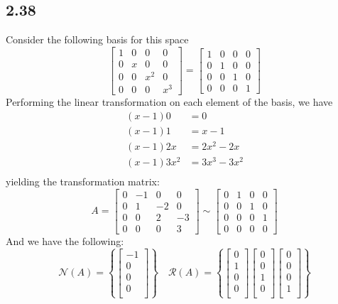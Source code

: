 \documentclass[letterpaper,12pt]{article}
\theoremstyle{definition}
\begin{document}
\subsection*{2.38}
Consider the following basis for this space
\[
\begin{bmatrix}
    1 & 0 & 0 & 0 \\
    0 & x & 0 & 0 \\
    0 & 0 & x^2 & 0 \\
    0 & 0 & 0 & x^3 
\end{bmatrix}
=
\begin{bmatrix}
    1 & 0 & 0 & 0 \\
    0 & 1 & 0 & 0 \\
    0 & 0 & 1 & 0 \\
    0 & 0 & 0 & 1 
\end{bmatrix}
\]
Performing the linear transformation on each element of the basis, we have
\begin{align*}
(x-1)0 &= 0 \\
(x-1)1 &= x-1 \\
(x-1)2x &= 2x^2-2x \\
(x-1)3x^2 &= 3x^3-3x^2 \\
\end{align*}
yielding the transformation matrix:
\[
A = 
\begin{bmatrix}
    0 & -1 & 0 & 0 \\
    0 & 1 & -2 & 0 \\
    0 & 0 & 2 & -3 \\
    0 & 0 & 0 & 3 
\end{bmatrix}
\sim
\begin{bmatrix}
    0 & 1 & 0 & 0 \\
    0 & 0 & 1 & 0 \\
    0 & 0 & 0 & 1 \\
    0 & 0 & 0 & 0 
\end{bmatrix}
\]
And we have the following:
\[
\mathscr{N}(A) = 
\left\{ \begin{bmatrix} -1 \\ 0 \\ 0 \\ 0 \\ \end{bmatrix} \right\}
\quad
\mathscr{R}(A) = 
\left\{ 
\begin{bmatrix} 0 \\ 1 \\ 0 \\ 0 \\ \end{bmatrix}
\begin{bmatrix} 0 \\ 0 \\ 1 \\ 0 \\ \end{bmatrix}
\begin{bmatrix} 0 \\ 0 \\ 0 \\ 1 \\ \end{bmatrix}
\right\}
\]
\end{document}
